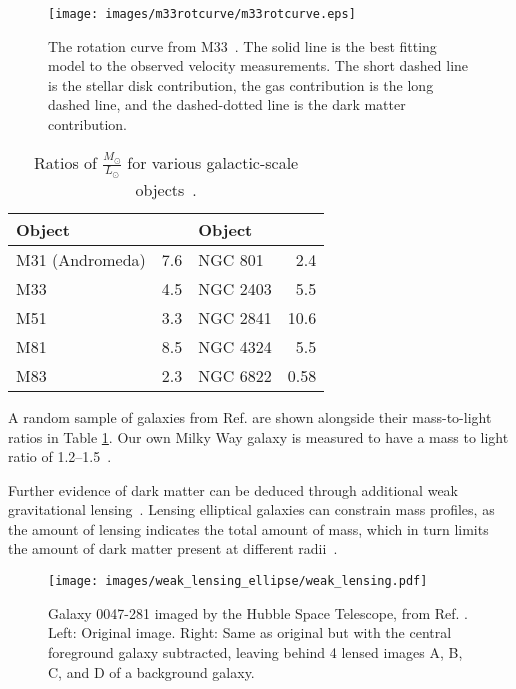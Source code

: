 \begin{figure}[bt]
  \centering
  \texttt{[image: images/m33rotcurve/m33rotcurve.eps]}
  \caption[M33 Rotation Curve]{
    The rotation curve from M33~\cite{m33rotcurve}.
    The solid line is the best fitting model to the observed velocity measurements.
    The short dashed line is the stellar disk contribution, the gas contribution is the long dashed line, and the dashed-dotted line is the dark matter contribution.
  }
  \label{fig:m33rotcurve}
\end{figure}

\begin{table}[h]
  \centering
  \caption[Ratios of $\frac{\textrm{M}_\odot}{\textrm{L}_\odot}$ for Various Galactic-scale Objects]{Ratios of $\frac{M_\odot}{L_\odot}$ for various galactic-scale objects~\cite{faber_ml}.}
  \label{tab:mlratios}
  \begin{tabular}{l r | l r}
    Object      &  \mlratio{} & Object & \mlratio{} \\
    \hline
    M31 (Andromeda) &  7.6  & NGC 801  &  2.4  \\
    M33             &  4.5  & NGC 2403 &  5.5  \\
    M51             &  3.3  & NGC 2841 & 10.6  \\
    M81             &  8.5  & NGC 4324 &  5.5  \\
    M83             &  2.3  & NGC 6822 &  0.58 \\
  \end{tabular}
\end{table}
      
A random sample of galaxies from Ref. \cite{faber_ml} are shown alongside their mass-to-light ratios in Table \ref{tab:mlratios}.
Our own Milky Way galaxy is measured to have a mass to light ratio of \SIrange{1.2}{1.5}{}~\cite{milkyway_ml_ratio}.

Further evidence of dark matter can be deduced through additional weak gravitational lensing~\cite{weak_lensing_2001}.
Lensing elliptical galaxies can constrain mass profiles, as the amount of lensing indicates the total amount of mass, which in turn limits the amount of dark matter present at different radii~\cite{weak_lensing_ellipse}.

\begin{figure}[!b]
  \centering
  \texttt{[image: images/weak\_lensing\_ellipse/weak\_lensing.pdf]}
  \caption[Weak Lensing with an Ellipse Galaxy]{
    Galaxy 0047-281 imaged by the Hubble Space Telescope, from Ref. \cite{weak_lensing_ellipse}.
    Left: Original image.
    Right: Same as original but with the central foreground galaxy subtracted, leaving behind 4 lensed images A, B, C, and D of a background galaxy.
  }
  \label{fig:ellipse}
\end{figure}
    
